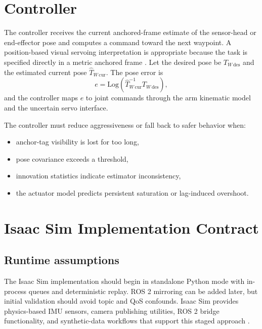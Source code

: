 \documentclass[11pt]{article}
\newcommand{\Log}{\mathrm{Log}}
\begin{document}
\section{Controller}
The controller receives the current anchored-frame estimate of the sensor-head or end-effector pose and computes a command toward the next waypoint. A position-based visual servoing interpretation is appropriate because the task is specified directly in a metric anchored frame \citep{chaumette2006part1, chaumette2007part2}. Let the desired pose be $T_{W\,\mathrm{des}}$ and the estimated current pose $\hat{T}_{W\,\mathrm{cur}}$. The pose error is
\begin{equation}
    e = \Log\!\left(\hat{T}_{W\,\mathrm{cur}}^{-1} T_{W\,\mathrm{des}}\right),
\end{equation}
and the controller maps $e$ to joint commands through the arm kinematic model and the uncertain servo interface.

The controller must reduce aggressiveness or fall back to safer behavior when:
\begin{itemize}[leftmargin=1.5em]
    \item anchor-tag visibility is lost for too long,
    \item pose covariance exceeds a threshold,
    \item innovation statistics indicate estimator inconsistency,
    \item the actuator model predicts persistent saturation or lag-induced overshoot.
\end{itemize}

\section{Isaac Sim Implementation Contract}
\subsection{Runtime assumptions}
The Isaac Sim implementation should begin in standalone Python mode with in-process queues and deterministic replay. ROS 2 mirroring can be added later, but initial validation should avoid topic and QoS confounds. Isaac Sim provides physics-based IMU sensors, camera publishing utilities, ROS 2 bridge functionality, and synthetic-data workflows that support this staged approach \citep{nvidia_isaac_imu, nvidia_isaac_ros2_bridge, nvidia_isaac_ros2_camera, nvidia_isaac_replicator, nvidia_isaac_sdr}.
\end{document}

